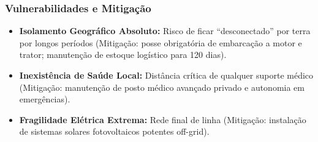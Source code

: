 \subsubsection{Vulnerabilidades e
Mitigação}

\begin{itemize}
\tightlist
\item
  \textbf{Isolamento Geográfico Absoluto:} Risco de ficar
  ``desconectado'' por terra por longos períodos (Mitigação: posse
  obrigatória de embarcação a motor e trator; manutenção de estoque
  logístico para 120 dias).
\item
  \textbf{Inexistência de Saúde Local:} Distância crítica de qualquer
  suporte médico (Mitigação: manutenção de posto médico avançado privado
  e autonomia em emergências).
\item
  \textbf{Fragilidade Elétrica Extrema:} Rede final de linha (Mitigação:
  instalação de sistemas solares fotovoltaicos potentes off-grid).
\end{itemize}

